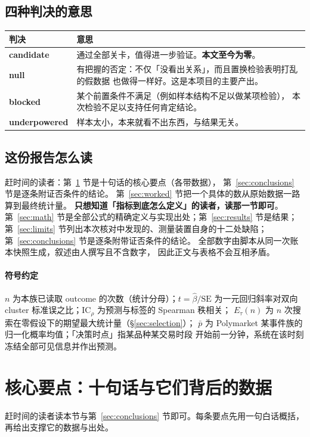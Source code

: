 \documentclass[11pt]{ctexart}
\begin{document}
\subsection{四种判决的意思}
\begin{center}\footnotesize
\begin{tabular}{@{}l p{}@{}}\toprule
判决 & 意思 \\ \midrule
\textbf{candidate} & 通过全部关卡，值得进一步验证。\textbf{本文至今为零}。 \\
\textbf{null} & 有把握的否定：不仅「没看出关系」，而且置换检验表明打乱的假数据
  也做得一样好。这是本项目的主要产出。 \\
\textbf{blocked} & 某个前置条件不满足（例如样本结构不足以做某项检验），
  本次检验不足以支持任何肯定结论。 \\
\textbf{underpowered} & 样本太小，本来就看不出东西，与结果无关。 \\
\bottomrule\end{tabular}\end{center}

\subsection{这份报告怎么读}
赶时间的读者：第~\ref{sec:insights} 节是十句话的核心要点（各带数据），
第~\ref{sec:conclusions} 节是逐条附证否条件的结论。
第~\ref{sec:worked} 节把一个具体的数从原始数据一路算到最终统计量。
\textbf{只想知道「指标到底怎么定义」的读者，读那一节即可}。
第~\ref{sec:math} 节是全部公式的精确定义与实现出处；第~\ref{sec:results} 节是结果；
第~\ref{sec:limits} 节列出本次核对中发现的、测量装置自身的十二处缺陷；
第~\ref{sec:conclusions} 节是逐条附带证否条件的结论。
全部数字由脚本从同一次账本快照生成，叙述由人撰写且不含数字，
因此正文与表格不会互相矛盾。

\paragraph{符号约定}$n$ 为本族已读取 outcome 的次数（统计分母）；$t=\hat\beta/\mathrm{SE}$
为一元回归斜率对双向 cluster 标准误之比；IC$_\rho$ 为预测与标签的 Spearman 秩相关；
$E_\tau(n)$ 为 $n$ 次搜索在零假设下的期望最大统计量（\S\ref{sec:selection}）；
$\bar p$ 为 Polymarket 某事件族的归一化概率均值；「决策时点」指某品种某交易时段
开始前一分钟，系统在该时刻冻结全部可见信息并作出预测。

\section{核心要点：十句话与它们背后的数据}\label{sec:insights}
赶时间的读者读本节与第~\ref{sec:conclusions} 节即可。每条要点先用一句白话概括，
再给出支撑它的数据与出处。
\end{document}
